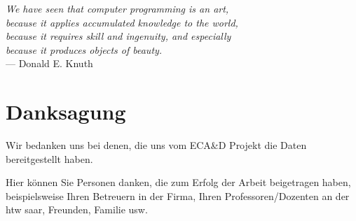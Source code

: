 
\begin{flushright}{\slshape    
    We have seen that computer programming is an art, \\ 
    because it applies accumulated knowledge to the world, \\ 
    because it requires skill and ingenuity, and especially \\
    because it produces objects of beauty.} \\ \medskip
    --- Donald E. Knuth \cite{knuth:1974}
\end{flushright}

\bigskip

\begingroup
	\let\clearpage\relax
	\let\cleardoublepage\relax
	\let\cleardoublepage\relax
	\chapter*{Danksagung}
    
    Wir bedanken uns bei denen, die uns vom ECA\&D Projekt die Daten bereitgestellt haben. \cite{klein2002eca}
    
	Hier können Sie Personen danken, die zum Erfolg der Arbeit beigetragen haben, beispielsweise Ihren Betreuern in der Firma, Ihren Professoren/Dozenten an der htw saar, Freunden, Familie usw.




\endgroup

